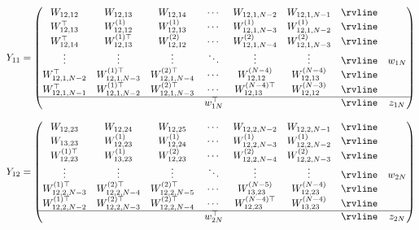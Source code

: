 \begin{appendices}
\begin{align}
    \label{eq:ch3_QSD-Y_11}
    Y_{11} =
    \begin{pmatrix}
        W_{12,12} & W_{12,13} & W_{12,14} & \cdots & W_{12,1,N-2} & W_{12,1,N-1} & \rvline & \\
        W_{12,13}^\top & W_{12,12}^{(1)} & W_{12,13}^{(1)} & \cdots & W_{12,1,N-3}^{(1)} & W_{12,1,N-2}^{(1)} & \rvline & \\
        W_{12,14}^\top & W_{12,13}^{(1)\top} & W_{12,12}^{(2)} & \cdots & W_{12,1,N-4}^{(2)} & W_{12,1,N-3}^{(2)} & \rvline & \\
        \vdots & \vdots & \vdots & \ddots & \vdots & \vdots & \rvline & w_{1N} \\
        W_{12,1,N-2}^\top & W_{12,1,N-3}^{(1)\top} & W_{12,1,N-4}^{(2)\top} & \cdots & W_{12,12}^{(N-4)} & W_{12,13}^{(N-4)} & \rvline & \\
        W_{12,1,N-1}^\top & W_{12,1,N-2}^{(1)\top} & W_{12,1,N-3}^{(2)\top} & \cdots & W_{12,13}^{(N-4)\top} & W_{12,12}^{(N-3)} & \rvline & \\
        \hline
         &  &  & w_{1N}^\top &  &  & \rvline & z_{1N} \\
    \end{pmatrix}
\end{align}

\begin{align}
    \label{eq:ch3_QSD-Y_12}
    Y_{12} =
    \begin{pmatrix}
        W_{12,23} & W_{12,24} & W_{12,25} & \cdots & W_{12,2,N-2} & W_{12,2,N-1} & \rvline & \\
        W_{13,23} & W_{12,23}^{(1)} & W_{12,24}^{(1)} & \cdots & W_{12,2,N-3}^{(1)} & W_{12,2,N-2}^{(1)} & \rvline &  \\
        W_{12,23}^{(1)\top} & W_{13,23}^{(1)} & W_{12,23}^{(2)} & \cdots & W_{12,2,N-4}^{(2)} & W_{12,2,N-3}^{(2)} & \rvline &  \\
        \vdots & \vdots & \vdots & \ddots & \vdots & \vdots & \rvline & w_{2N} \\
        W_{12,2,N-3}^{(1)\top} & W_{12,2,N-4}^{(2)\top} & W_{12,2,N-5}^{(2)\top} & \cdots & W_{13,23}^{(N-5)} & W_{12,23}^{(N-4)} & \rvline &  \\
        W_{12,2,N-2}^{(1)\top} & W_{12,2,N-3}^{(2)\top} & W_{12,2,N-4}^{(2)\top} & \cdots & W_{12,23}^{(N-4)\top} & W_{13,23}^{(N-4)} & \rvline &  \\
        \hline
         &  &  & w_{2N}^\top &  &  & \rvline & z_{2N} \\
    \end{pmatrix}
\end{align}


\end{appendices}
